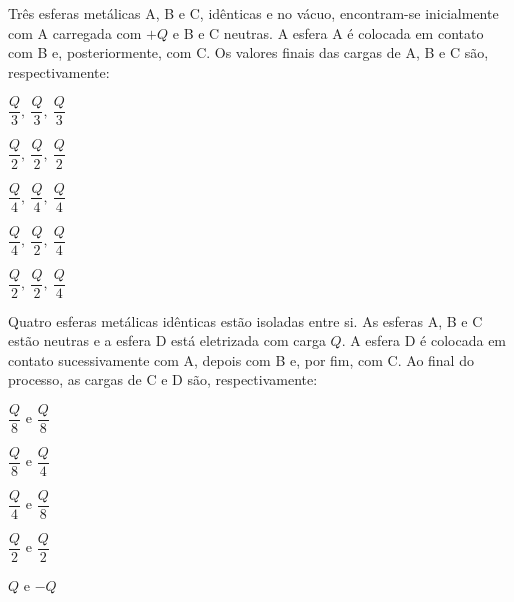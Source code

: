 \blocoaprofundamento

\begin{questao}[3]{}
Três esferas metálicas A, B e C, idênticas e no vácuo, encontram-se inicialmente
com A carregada com $+Q$ e B e C neutras. A esfera A é colocada em contato com B
e, posteriormente, com C. Os valores finais das cargas de A, B e C são,
respectivamente:
\begin{alternativas}[2]
\item $\dfrac{Q}{3},\ \dfrac{Q}{3},\ \dfrac{Q}{3}$
\item $\dfrac{Q}{2},\ \dfrac{Q}{2},\ \dfrac{Q}{2}$
\item $\dfrac{Q}{4},\ \dfrac{Q}{4},\ \dfrac{Q}{4}$
\item $\dfrac{Q}{4},\ \dfrac{Q}{2},\ \dfrac{Q}{4}$
\item $\dfrac{Q}{2},\ \dfrac{Q}{2},\ \dfrac{Q}{4}$
\end{alternativas}
\end{questao}

\begin{questao}[3]{}
Quatro esferas metálicas idênticas estão isoladas entre si. As esferas A, B e C
estão neutras e a esfera D está eletrizada com carga $Q$. A esfera D é colocada
em contato sucessivamente com A, depois com B e, por fim, com C.
Ao final do processo, as cargas de C e D são, respectivamente:
\begin{alternativas}[2]
\item $\dfrac{Q}{8}$ e $\dfrac{Q}{8}$
\item $\dfrac{Q}{8}$ e $\dfrac{Q}{4}$
\item $\dfrac{Q}{4}$ e $\dfrac{Q}{8}$
\item $\dfrac{Q}{2}$ e $\dfrac{Q}{2}$
\item $Q$ e $-Q$
\end{alternativas}
\end{questao}

